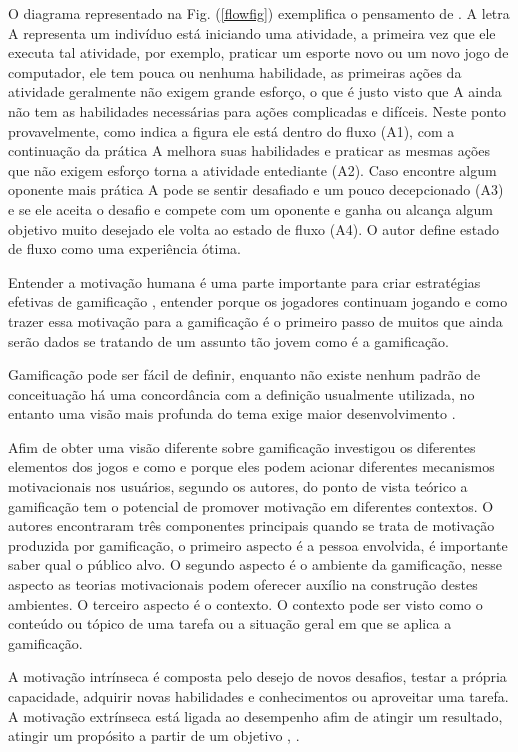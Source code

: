 O diagrama representado na Fig. (\ref{flowfig}) exemplifica o pensamento de \cite{1990flow}. A letra A representa um indivíduo está iniciando uma atividade, a primeira vez que ele executa tal atividade, por exemplo, praticar um esporte novo ou um novo jogo de computador, ele tem pouca ou nenhuma habilidade, as primeiras ações da atividade geralmente não exigem grande esforço, o que é justo visto que A ainda não tem as habilidades necessárias para ações complicadas e difíceis. Neste ponto provavelmente, como indica a figura ele está dentro do fluxo (A1), com a continuação da prática A melhora suas habilidades e praticar as mesmas ações que não exigem esforço torna a atividade entediante (A2). Caso encontre algum oponente mais prática A pode se sentir desafiado e um pouco decepcionado (A3) e se ele aceita o desafio e compete com um oponente e ganha ou alcança algum objetivo muito desejado ele volta ao estado de fluxo (A4). O autor define estado de fluxo como uma experiência ótima.

Entender a motivação humana é uma parte importante para criar estratégias efetivas de gamificação \cite{kumar2013gamification}, entender porque os jogadores continuam jogando e como trazer essa motivação para a gamificação é o primeiro passo de muitos que ainda serão dados se tratando de um assunto tão jovem como é a gamificação.

Gamificação pode ser fácil de definir, enquanto não existe nenhum padrão de conceituação há uma concordância com a definição usualmente utilizada, no entanto uma visão mais profunda do tema exige maior desenvolvimento \cite{seaborn2015gamification}. 

Afim de obter uma visão diferente sobre gamificação  \cite{sailer2013psychological} investigou os diferentes elementos dos jogos  e como e porque eles podem acionar diferentes mecanismos motivacionais nos usuários, segundo os autores, do ponto de vista teórico  a gamificação tem o potencial de promover motivação em diferentes contextos. O autores encontraram três componentes principais quando se trata de motivação produzida por gamificação, o primeiro aspecto é a pessoa envolvida, é importante saber qual o público alvo. O segundo aspecto é o ambiente da gamificação, nesse aspecto as teorias motivacionais podem oferecer auxílio na construção destes ambientes. O terceiro aspecto é o contexto. O contexto pode ser visto como o conteúdo ou tópico de uma tarefa ou a situação geral em que se aplica a gamificação.

A motivação intrínseca é composta pelo desejo de novos desafios, testar a própria capacidade, adquirir novas habilidades e conhecimentos ou aproveitar uma tarefa. A motivação extrínseca está ligada ao desempenho afim de atingir um resultado, atingir um propósito a partir de um objetivo \cite{maican2016interactivia}, \cite{chou2015actionable}.


